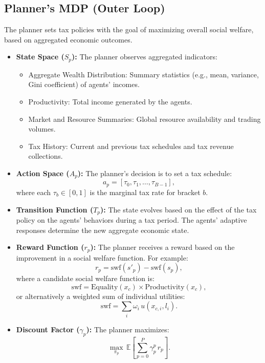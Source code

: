 \subsection{Planner's MDP (Outer Loop)}
The planner sets tax policies with the goal of maximizing overall social welfare, based on aggregated economic outcomes.

\begin{itemize}
    \item \textbf{State Space ($S_p$):} The planner observes aggregated indicators:
    \begin{itemize}
        \item Aggregate Wealth Distribution: Summary statistics (e.g., mean, variance, Gini coefficient) of agents' incomes.
        \item Productivity: Total income generated by the agents.
        \item Market and Resource Summaries: Global resource availability and trading volumes.
        \item Tax History: Current and previous tax schedules and tax revenue collections.
    \end{itemize}
    
    \item \textbf{Action Space ($A_p$):} The planner's decision is to set a tax schedule:
    \[
    a_p = [\tau_0, \tau_1, \dots, \tau_{B-1}],
    \]
    where each \(\tau_b \in [0,1]\) is the marginal tax rate for bracket \(b\).
    
    \item \textbf{Transition Function ($T_p$):} The state evolves based on the effect of the tax policy on the agents' behaviors during a tax period. The agents’ adaptive responses determine the new aggregate economic state.
    
    \item \textbf{Reward Function ($r_p$):} The planner receives a reward based on the improvement in a social welfare function. For example:
    \[
    r_p = \text{swf}(s'_p) - \text{swf}(s_p),
    \]
    where a candidate social welfare function is:
    \[
    \text{swf} = \text{Equality}(x_c) \times \text{Productivity}(x_c),
    \]
    or alternatively a weighted sum of individual utilities:
    \[
    \text{swf} = \sum_{i} \omega_i\, u(x_{c,i}, l_i).
    \]
    
    \item \textbf{Discount Factor ($\gamma_p$):} The planner maximizes:
    \[
    \max_{\pi_p} \, \mathbb{E}\left[\sum_{p=0}^{P} \gamma_p^p\, r_p\right].
    \]
\end{itemize}
